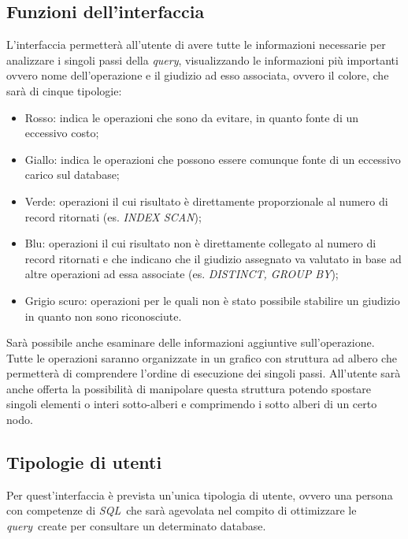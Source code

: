 \subsection{Funzioni dell'interfaccia}
L'interfaccia permetterà all'utente di avere tutte le informazioni necessarie per analizzare i singoli passi della \textit{query}, visualizzando le informazioni più importanti ovvero nome dell'operazione e il giudizio ad esso associata, ovvero il colore, che sarà di cinque tipologie: \\
\begin{itemize}
\item Rosso: indica le operazioni che sono da evitare, in quanto fonte di un eccessivo costo;
\item Giallo: indica le operazioni che possono essere comunque fonte di un eccessivo carico sul database;
\item Verde: operazioni il cui risultato è direttamente proporzionale al numero di record ritornati (es. \textit{INDEX SCAN});
\item Blu: operazioni il cui risultato non è direttamente collegato al numero di record ritornati e che indicano che il giudizio assegnato va valutato in base ad altre operazioni ad essa associate (es. \textit{DISTINCT, GROUP BY});
\item Grigio scuro: operazioni per le quali non è stato possibile stabilire un giudizio in quanto non sono riconosciute.
\end{itemize}
Sarà possibile anche esaminare delle informazioni aggiuntive sull'operazione.\\
\newline
Tutte le operazioni saranno organizzate in un grafico con struttura ad albero che permetterà di comprendere l'ordine di esecuzione dei singoli passi. All'utente sarà anche offerta la possibilità di manipolare questa struttura potendo spostare singoli elementi o interi sotto-alberi e comprimendo i sotto alberi di un certo nodo.
\subsection{Tipologie di utenti}
Per quest'interfaccia è prevista un'unica tipologia di utente, ovvero una persona con competenze di \textit{SQL}\ che sarà agevolata nel compito di ottimizzare le \textit{query}\ create per consultare un determinato database.
